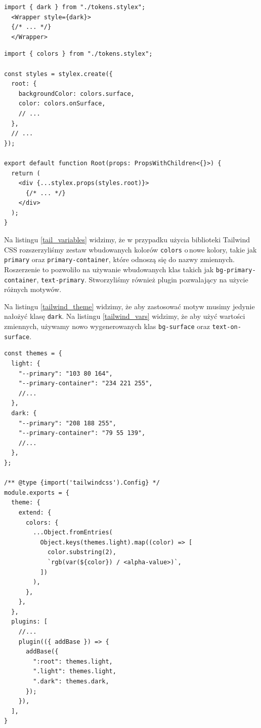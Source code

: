 \documentclass[a4paper,12pt]{book} %
\begin{document}
\begin{lstfloat}[hb]
  \lstset{language=HTML}
  \begin{lstlisting}[frame=single]
  import { dark } from "./tokens.stylex";
  <Wrapper style={dark}>
  {/* ... */}
  </Wrapper>
\end{lstlisting}
  \caption{StyleX nałożenie motywu}\label{stylex_theme}
\end{lstfloat}

\begin{lstfloat}[hb]
  \lstset{language=HTML}
  \begin{lstlisting}[frame=single]
import { colors } from "./tokens.stylex";

const styles = stylex.create({
  root: {
    backgroundColor: colors.surface,
    color: colors.onSurface,
    // ...
  },
  // ...
});

export default function Root(props: PropsWithChildren<{}>) {
  return (
    <div {...stylex.props(styles.root)}>
      {/* ... */}
    </div>
  );
}
\end{lstlisting}
  \caption{StyleX użycie zmiennych }\label{stylex_vars}
\end{lstfloat}

\clearpage 

Na listingu \ref{tail_variables} widzimy, że w przypadku użycia biblioteki Tailwind CSS rozszerzyliśmy zestaw wbudowanych kolorów \lstinline|colors| o\,nowe kolory, takie jak \lstinline|primary| oraz \lstinline|primary-container|, które odnoszą się do nazwy zmiennych. Roszerzenie to pozwoliło na używanie wbudowanych klas takich jak \lstinline|bg-primary-container|, \lstinline|text-primary|. Stworzyliśmy również plugin pozwalający na użycie różnych motywów.

Na listingu \ref{tailwind_theme} widzimy, że aby zastosować motyw musimy jedynie nałożyć klasę \lstinline|dark|. Na listingu \ref{tailwind_vars} widzimy, że aby użyć wartości zmiennych, używamy nowo wygenerowanych klas \lstinline|bg-surface| oraz \lstinline|text-on-surface|.

\begin{lstfloat}[hb]
  \lstset{language=HTML}
  \begin{lstlisting}[frame=single]
const themes = {
  light: {
    "--primary": "103 80 164",
    "--primary-container": "234 221 255",
    //...
  },
  dark: {
    "--primary": "208 188 255",
    "--primary-container": "79 55 139",
    //...
  },
};

/** @type {import('tailwindcss').Config} */
module.exports = {
  theme: {
    extend: {
      colors: {
        ...Object.fromEntries(
          Object.keys(themes.light).map((color) => [
            color.substring(2),
            `rgb(var(${color}) / <alpha-value>)`,
          ])
        ),
      },
    },
  },
  plugins: [
    //...
    plugin(({ addBase }) => {
      addBase({
        ":root": themes.light,
        ".light": themes.light,
        ".dark": themes.dark,
      });
    }),
  ],
}
\end{lstlisting}
  \caption{Tailwind CSS zmienne CSS}\label{tail_variables}
\end{lstfloat}
\end{document}

